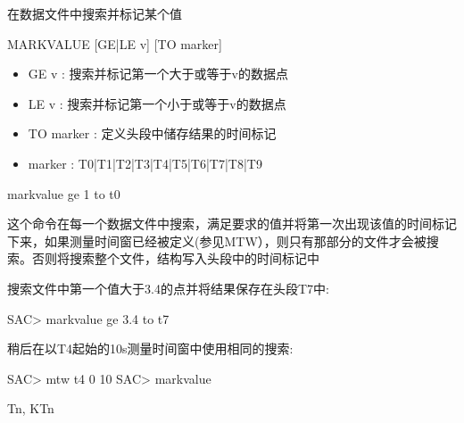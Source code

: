 \label{cmd:markvalue}

在数据文件中搜索并标记某个值

\begin{SACSTX}
MARKVALUE [GE|LE v] [TO marker]
\end{SACSTX}

\begin{itemize}
\item GE v : 搜索并标记第一个大于或等于v的数据点 
\item LE v : 搜索并标记第一个小于或等于v的数据点 
\item TO marker : 定义头段中储存结果的时间标记 
\item marker : T0|T1|T2|T3|T4|T5|T6|T7|T8|T9 
\end{itemize}

\begin{SACDFT}
markvalue ge 1 to t0
\end{SACDFT}

这个命令在每一个数据文件中搜索，满足要求的值并将第一次出现该值的时间标记下来，如果测量时间窗已经被定义(参见MTW），则只有那部分的文件才会被搜索。否则将搜索整个文件，结构写入头段中的时间标记中

搜索文件中第一个值大于3.4的点并将结果保存在头段T7中:
\begin{SACCode}
SAC> markvalue ge 3.4 to t7
\end{SACCode}

稍后在以T4起始的10s测量时间窗中使用相同的搜索:
\begin{SACCode}
SAC> mtw t4 0 10
SAC> markvalue
\end{SACCode}

Tn, KTn

